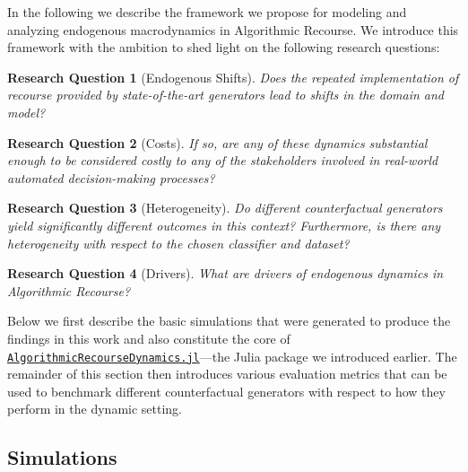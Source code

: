 \documentclass[conference,final,]{IEEEtran}
\newtheorem{proposition}{Research Question}[section]
\theoremstyle{definition}
\theoremstyle{definition}
\theoremstyle{definition}
\theoremstyle{definition}
\theoremstyle{remark}
\begin{document}
In the following we describe the framework we propose for modeling and analyzing endogenous macrodynamics in Algorithmic Recourse. We introduce this framework with the ambition to shed light on the following research questions:

\begin{proposition}[Endogenous Shifts]
\protect\hypertarget{prp:shifts}{}\label{prp:shifts}Does the repeated implementation of recourse provided by state-of-the-art generators lead to shifts in the domain and model?
\end{proposition}

\begin{proposition}[Costs]
\protect\hypertarget{prp:costs}{}\label{prp:costs}If so, are any of these dynamics substantial enough to be considered costly to any of the stakeholders involved in real-world automated decision-making processes?
\end{proposition}

\begin{proposition}[Heterogeneity]
\protect\hypertarget{prp:het}{}\label{prp:het}Do different counterfactual generators yield significantly different outcomes in this context? Furthermore, is there any heterogeneity with respect to the chosen classifier and dataset?
\end{proposition}

\begin{proposition}[Drivers]
\protect\hypertarget{prp:drive}{}\label{prp:drive}What are drivers of endogenous dynamics in Algorithmic Recourse?
\end{proposition}

Below we first describe the basic simulations that were generated to produce the findings in this work and also constitute the core of \href{https://anonymous.4open.science/r/AlgorithmicRecourseDynamics/README.md}{\texttt{AlgorithmicRecourseDynamics.jl}}---the Julia package we introduced earlier. The remainder of this section then introduces various evaluation metrics that can be used to benchmark different counterfactual generators with respect to how they perform in the dynamic setting.

\hypertarget{method-2-experiment}{%
\subsection{Simulations}\label{method-2-experiment}}
\end{document}
